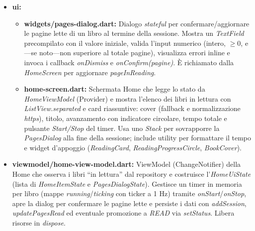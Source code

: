 \documentclass{article}
\begin{document}
\begin{itemize}
\begin{itemize}
\begin{itemize}
    \end{itemize}
    \item \textbf{ui:}
    \begin{itemize}
      \item \textbf{widgets/pages-dialog.dart:} Dialogo \textit{stateful} per confermare/aggiornare le pagine lette di un libro al termine della sessione. Mostra un \textit{TextField} precompilato con il valore iniziale, valida l’input numerico (intero, $\ge 0$, e—se noto—non superiore al totale pagine), visualizza errori inline e invoca i callback \textit{onDismiss} e \textit{onConfirm(pagine)}. È richiamato dalla \textit{HomeScreen} per aggiornare \textit{pageInReading}.
      \item \textbf{home-screen.dart:} Schermata Home che legge lo stato da \textit{HomeViewModel} (Provider) e mostra l’elenco dei libri in lettura con \textit{ListView.separated} e card riassuntive: cover (fallback e normalizzazione \textit{https}), titolo, avanzamento con indicatore circolare, tempo totale e pulsante \emph{Start/Stop} del timer. Usa uno \textit{Stack} per sovrapporre la \textit{PagesDialog} alla fine della sessione; include utility per formattare il tempo e widget d’appoggio (\textit{ReadingCard}, \textit{ReadingProgressCircle}, \textit{BookCover}).
    \end{itemize}
    \item \textbf{viewmodel/home-view-model.dart:} ViewModel (ChangeNotifier) della Home che osserva i libri “in lettura” dal repository e costruisce l’\textit{HomeUiState} (lista di \textit{HomeItemState} e \textit{PagesDialogState}). Gestisce un timer in memoria per libro (mappe \textit{running}/\textit{ticking} con ticker a 1 Hz) tramite \textit{onStart}/\textit{onStop}, apre la dialog per confermare le pagine lette e persiste i dati con \textit{addSession}, \textit{updatePagesRead} ed eventuale promozione a \textit{READ} via \textit{setStatus}. Libera risorse in \textit{dispose}.


\end{itemize}
\end{itemize}
\end{document}
